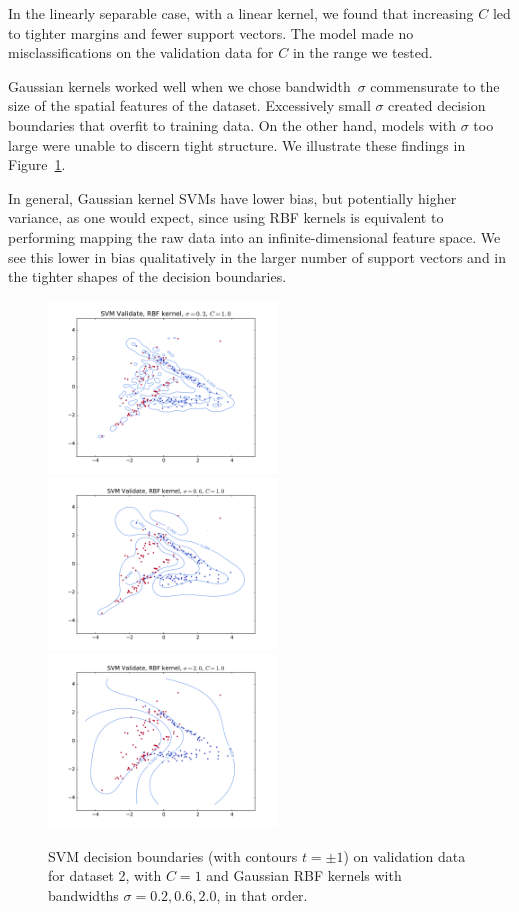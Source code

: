 \documentclass{article}
\begin{document}
\begin{multicols}{2}
In the linearly separable case, with a linear kernel,
we found that increasing $C$ led to tighter margins and fewer support vectors.
The model made no misclassifications on the validation data for $C$ in the range we tested.

Gaussian kernels worked well when we chose bandwidth~$\sigma$
commensurate to the size of the spatial features of the dataset.
Excessively small $\sigma$ created decision boundaries that overfit to training data.
On the other hand, models with $\sigma$ too large were unable to discern tight structure.
We illustrate these findings in Figure~\ref{fig:2-3-gaussian-rbf}.

In general,
Gaussian kernel SVMs have lower bias,
but potentially higher variance,
as one would expect, since using RBF kernels is equivalent to
performing mapping the raw data into an infinite-dimensional feature space.
We see this lower in bias qualitatively
in the larger number of support vectors
and in the tighter shapes of the decision boundaries.

\begin{figure}[t]
   \centering
   \includegraphics[width=2.4in]{img/p2-3-d2-c1-rbf02/validate.pdf}
   \includegraphics[width=2.4in]{img/p2-3-d2-c1-rbf06/validate.pdf}
   \includegraphics[width=2.4in]{img/p2-3-d2-c1-rbf20/validate.pdf}
   \caption{SVM decision boundaries (with contours $t = \pm1$) on validation data for dataset 2, with $C = 1$ and Gaussian RBF kernels with bandwidths $\sigma=0.2,0.6,2.0$, in that order.}
   \label{fig:2-3-gaussian-rbf}
\end{figure}


\end{multicols}
\end{document}

